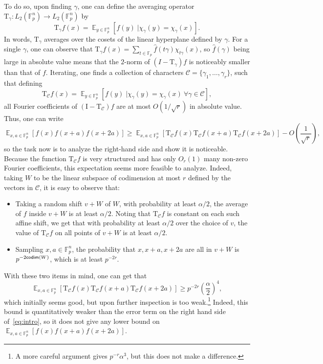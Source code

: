 \documentclass[11pt]{article}
\newcommand\cExpect[3]{{\mathop{\mathbb{E}}_{#1}\left[ \left. #3 \;\right\vert #2 \right]}}
\newcommand\Expect[2]{{\mathop{\mathbb{E}}_{#1}\left[ {#2} \right]}}
\renewcommand\geq{\geqslant}
\begin{document}
To do so, upon finding $\gamma$, one can define the averaging operator 
$\mathrm{T}_{\gamma}\colon L_2(\mathbb{F}_p^n)\to L_2(\mathbb{F}_p^n)$ by
\[
\mathrm{T}_{\gamma}f(x)
=\cExpect{y\in\mathbb{F}_p^n}
{\chi_{\gamma}(y) = \chi_{\gamma}(x)}{f(y)}.
\]
In words, $\mathrm{T}_{\gamma}$ averages over the cosets of the linear hyperplane defined by $\gamma$. For a single $\gamma$, one can observe that $\mathrm{T}_{\gamma}f(x) = \sum\limits_{t\in\mathbb{F}_p}\widehat{f}(t\gamma)\chi_{t\gamma}(x)$, so $\widehat{f}(\gamma)$ being large in absolute value means that the $2$-norm of $(I-\mathrm{T}_{\gamma})f$ is noticeably smaller than that of $f$. Iterating, one finds a collection of characters $\mathcal{C} = \{\gamma_1,\ldots,\gamma_r\}$, such that defining
\[
\mathrm{T}_{\mathcal{C}}f(x)
=\cExpect{y\in\mathbb{F}_p^n}
{\chi_{\gamma}(y) = \chi_{\gamma}(x)~\forall\gamma\in\mathcal{C}}{f(y)},
\]
all Fourier coefficients of $(\mathrm{I}-\mathrm{T}_{\mathcal{C}})f$ are at most $O(1/\sqrt{r})$ in absolute value. Thus, one can write
\begin{equation}\label{eq:intro}
\Expect{x,a\in\mathbb{F}_p^n}{f(x)f(x+a)f(x+2a)}
\geq
\Expect{x,a\in\mathbb{F}_p^n}{\mathrm{T}_{\mathcal{C}}f(x)\mathrm{T}_{\mathcal{C}}f(x+a)\mathrm{T}_{\mathcal{C}}f(x+2a)}
-O\left(\frac{1}{\sqrt{r}}\right),
\end{equation}
so the task now is to analyze the right-hand side and show it is noticeable. Because the function 
$\mathrm{T}_{\mathcal{C}}f$ is very structured and has only $O_{r}(1)$ many non-zero Fourier coefficients, this expectation seems more feasible to analyze. Indeed, taking $W$ to be the linear subspace of codimension at most $r$ defined by the vectors in $\mathcal{C}$, it is easy to observe that:
\begin{itemize}
    \item Taking a random shift $v+W$ of $W$, with probability at least $\alpha/2$, the average of $f$ inside $v+W$ is at least $\alpha/2$. Noting that $\mathrm{T}_{\mathcal{C}} f$ is constant on each such affine shift, we get that with probability at least $\alpha/2$ over the choice of $v$, the value of $\mathrm{T}_{\mathcal{C}} f$ on all points of $v+W$ is at least $\alpha/2$.
    \item Sampling $x,a\in\mathbb{F}_p^n$, the probability that $x,x+a,x+2a$ are all in $v+W$ is $p^{-2{\sf codim}(W)}$, which is at least $p^{-2r}$.
\end{itemize}
With these two items in mind, one can get that
\[
\Expect{x,a\in\mathbb{F}_p^n}{\mathrm{T}_{\mathcal{C}}f(x)\mathrm{T}_{\mathcal{C}}f(x+a)\mathrm{T}_{\mathcal{C}}f(x+2a)}\geq p^{-2r}\left(\frac{\alpha}{2}\right)^{4},
\]
which initially seems good, but upon further inspection is too weak.\footnote{A more careful argument gives $p^{-r}\alpha^{3}$, but this does not make a difference.} Indeed, this bound is quantitatively weaker than the error term on the right hand side of~\eqref{eq:intro}, so it does not give any lower bound on $\Expect{x,a\in\mathbb{F}_p^n}{f(x)f(x+a)f(x+2a)}$.
\end{document}
